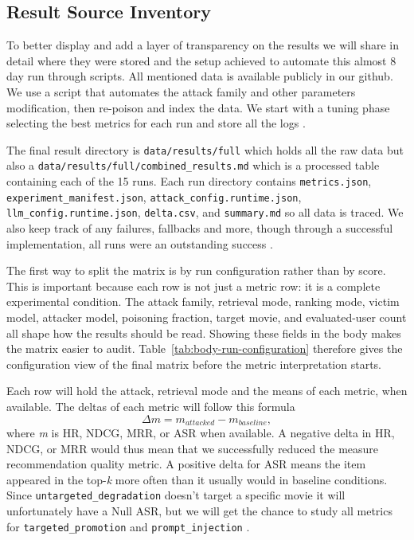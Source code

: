\subsection{Result Source Inventory}

To better display and add a layer of transparency on the results we will share in detail where they were stored and the setup achieved to automate this almost 8 day run through scripts. All mentioned data is available publicly in our github. We use a script that automates the attack family and other parameters modification, then re-poison and index the data. We start with a tuning phase selecting the best metrics for each run and store all the logs \cite{ragpoisonlab_repo}. 

The final result directory is \texttt{data/results/full} which holds all the raw data but also a \texttt{data/results/full/combined\_results.md} which is a processed table containing each of the 15 runs. Each run directory contains \texttt{metrics.json}, \texttt{experiment\_manifest.json}, \texttt{attack\_config.runtime.json}, \texttt{llm\_config.runtime.json}, \texttt{delta.csv}, and \texttt{summary.md} so all data is traced. We also keep track of any failures, fallbacks and more, though through a successful implementation, all runs were an outstanding success \cite{ragpoisonlab_repo}.



The first way to split the matrix is by run configuration rather than by score. This is important because each row is not just a metric row: it is a complete experimental condition. The attack family, retrieval mode, ranking mode, victim model, attacker model, poisoning fraction, target movie, and evaluated-user count all shape how the results should be read. Showing these fields in the body makes the matrix easier to audit. Table~\ref{tab:body-run-configuration} therefore gives the configuration view of the final matrix before the metric interpretation starts.




Each row will hold the attack, retrieval mode and the means of each metric, when available. The deltas of each metric will follow this formula \cite{ragpoisonlab_repo}
\begin{equation}
\Delta m = m_{attacked} - m_{baseline},
\end{equation}
where \textit{m} is HR, NDCG, MRR, or ASR when available. A negative delta in HR, NDCG, or MRR would thus mean that we successfully reduced the measure recommendation quality metric. A positive delta for ASR means the item appeared in the top-\textit{k} more often than it usually would in baseline conditions. Since \texttt{untargeted\_degradation} doesn't target a specific movie it will unfortunately have a Null ASR, but we will get the chance to study all metrics for \texttt{targeted\_promotion} and \texttt{prompt\_injection} \cite{ragpoisonlab_repo,herlocker2004evaluating,wang2013ndcg}.

